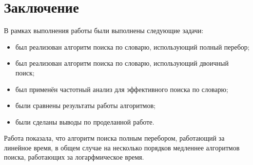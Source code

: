 \chapter*{Заключение}

В рамках выполнения работы были выполнены следующие задачи:
\begin{itemize}
	\item был реализован алгоритм поиска по словарю, использующий полный перебор;
	\item был реализован алгоритм поиска по словарю, использующий двоичный поиск;
	\item был применён частотный анализ для эффективного поиска по словарю;
    \item были сравнены результаты работы алгоритмов;
    \item были сделаны выводы по проделанной работе.
\end{itemize}

Работа показала, что алгоритм поиска полным перебором, работающий за линейное время, в общем случае на несколько порядков медленнее алгоритмов поиска, работающих за логарфмическое время.
